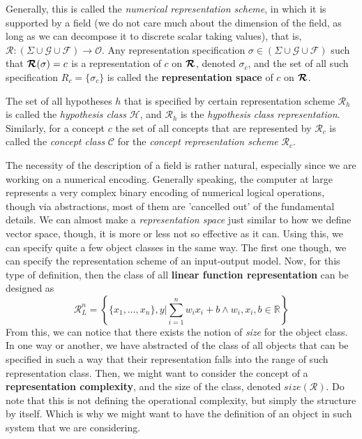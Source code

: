 \documentclass[10pt]{article}
\begin{document}
Generally, this is called the \textit{numerical representation scheme}, in which it is supported by a field (we do not care much about the dimension of the field, as long as we can decompose it to discrete scalar taking values), that is, $\bm{\mathcal{R}}:(\Sigma \cup \mathcal{G}\cup \mathcal{F})\to \mathcal{O}$. Any representation specification $\sigma\in (\Sigma \cup \mathcal{G}\cup \mathcal{F})$ such that $\bm{\mathcal{R}}(\sigma) = c$ is a representation of $c$ on $\bm{\mathcal{R}}$, denoted $\sigma_{c}$, and the set of all such specification $R_{c}=\{\sigma_{c}\}$ is called the \textbf{representation space} of $c$ on $\bm{\mathcal{R}}$.

The set of all hypotheses $h$ that is specified by certain representation scheme $\bm{\mathcal{R}}_{h}$ is called the \textit{hypothesis class} $\mathcal{H}$, and $\bm{\mathcal{R}}_{h}$ is the \textit{hypothesis class representation}. Similarly, for a concept $c$ the set of all concepts that are represented by $\bm{\mathcal{R}}_{c}$ is called the \textit{concept class} $\mathcal{C}$ for the \textit{concept representation scheme} $\bm{\mathcal{R}}_{c}$.

The necessity of the description of a field is rather natural, especially since we are working on a numerical encoding. Generally speaking, the computer at large represents a very complex binary encoding of numerical logical operations, though via abstractions, most of them are 'cancelled out' of the fundamental details. We can almost make a \textit{representation space} just similar to how we define vector space, though, it is more or less not so effective as it can.
Using this, we can specify quite a few object classes in the same way. The first one though, we can specify the representation scheme of an input-output model. Now, for this type of definition, then the class of all \textbf{linear function representation} can be designed as 
\begin{equation}
    \bm{\mathcal{R}}_{L}^{n} = \left\{ \{x_{1},\dots,x_{n}\}, y \Bigg| \sum_{i=1}^{n}w_{i}x_{i} + b \land w_{i}, x_{i}, b \in \mathbb{R} \right\}
\end{equation}
From this, we can notice that there exists the notion of \textit{size} for the object class. In one way or another, we have abstracted of the class of all objects that can be specified in such a way that their representation falls into the range of such representation class. Then, we might want to consider the concept of a \textbf{representation complexity}, and the size of the class, denoted $size(\bm{\mathcal{R}})$. Do note that this is not defining the operational complexity, but simply the structure by itself. Which is why we might want to have the definition of an object in such system that we are considering.
\end{document}
